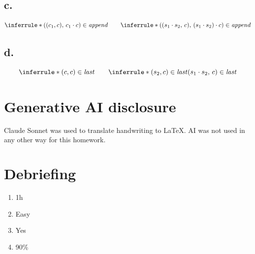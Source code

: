 \documentclass[11pt]{article}
\begin{document}
\subsection*{c.}

\[
\inferrule*{ }{((c_1,c),\,c_1 \cdot c) \in \mathit{append}} \qquad
\inferrule*{ }{((s_1 \cdot s_2,\,c),\,(s_1 \cdot s_2)\cdot c) \in \mathit{append}}
\]

\subsection*{d.}

\[
\inferrule*{ }{(c,c) \in \mathit{last}} \qquad
\inferrule*{
  (s_2,c) \in \mathit{last}
}{
  (s_1 \cdot s_2,\,c) \in \mathit{last}
}
\]

\section*{Generative AI disclosure}
Claude Sonnet was used to translate handwriting to LaTeX. AI was not used in any other way for this homework.

\section*{Debriefing}
\begin{enumerate}
\item 1h
\item Easy
\item Yes
\item 90\%
\end{enumerate}
\end{document}
